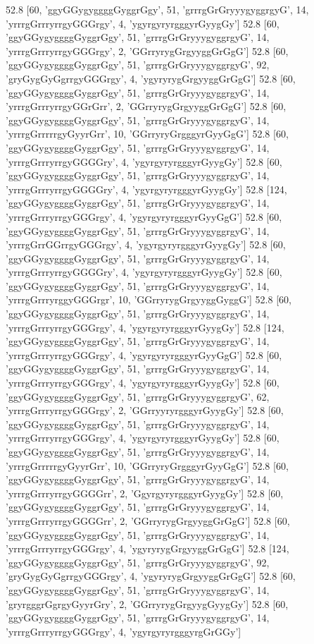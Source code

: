 52.8 [60, 'ggyGGygyggggGyggrGgy', 51, 'grrrgGrGryyygyggrgyG', 14, 'yrrrgGrrryrrgyGGGrgy', 4, 'ygyrgyryrgggyrGyygGy']
52.8 [60, 'ggyGGygyggggGyggrGgy', 51, 'grrrgGrGryyygyggrgyG', 14, 'yrrrgGrrryrrgyGGGrgy', 2, 'GGrryrygGrgyyggGrGgG']
52.8 [60, 'ggyGGygyggggGyggrGgy', 51, 'grrrgGrGryyygyggrgyG', 92, 'gryGygGyGgrrgyGGGrgy', 4, 'ygyryrygGrgyyggGrGgG']
52.8 [60, 'ggyGGygyggggGyggrGgy', 51, 'grrrgGrGryyygyggrgyG', 14, 'yrrrgGrrryrrgyGGrGrr', 2, 'GGrryrygGrgyyggGrGgG']
52.8 [60, 'ggyGGygyggggGyggrGgy', 51, 'grrrgGrGryyygyggrgyG', 14, 'yrrrgGrrrrrgyGyyrGrr', 10, 'GGrryryGrgggyrGyyGgG']
52.8 [60, 'ggyGGygyggggGyggrGgy', 51, 'grrrgGrGryyygyggrgyG', 14, 'yrrrgGrrryrrgyGGGGry', 4, 'ygyrgyryrgggyrGyygGy']
52.8 [60, 'ggyGGygyggggGyggrGgy', 51, 'grrrgGrGryyygyggrgyG', 14, 'yrrrgGrrryrrgyGGGGry', 4, 'ygyrgyryrgggyrGyygGy']
52.8 [124, 'ggyGGygyggggGyggrGgy', 51, 'grrrgGrGryyygyggrgyG', 14, 'yrrrgGrrryrrgyGGGrgy', 4, 'ygyrgyryrgggyrGyyGgG']
52.8 [60, 'ggyGGygyggggGyggrGgy', 51, 'grrrgGrGryyygyggrgyG', 14, 'yrrrgGrrGGrrgyGGGrgy', 4, 'ygyrgyryrgggyrGyygGy']
52.8 [60, 'ggyGGygyggggGyggrGgy', 51, 'grrrgGrGryyygyggrgyG', 14, 'yrrrgGrrryrrgyGGGGry', 4, 'ygyrgyryrgggyrGyygGy']
52.8 [60, 'ggyGGygyggggGyggrGgy', 51, 'grrrgGrGryyygyggrgyG', 14, 'yrrrgGrrryrggyGGGrgr', 10, 'GGrryrygGrgyyggGyggG']
52.8 [60, 'ggyGGygyggggGyggrGgy', 51, 'grrrgGrGryyygyggrgyG', 14, 'yrrrgGrrryrrgyGGGrgy', 4, 'ygyrgyryrgggyrGyygGy']
52.8 [124, 'ggyGGygyggggGyggrGgy', 51, 'grrrgGrGryyygyggrgyG', 14, 'yrrrgGrrryrrgyGGGrgy', 4, 'ygyrgyryrgggyrGyyGgG']
52.8 [60, 'ggyGGygyggggGyggrGgy', 51, 'grrrgGrGryyygyggrgyG', 14, 'yrrrgGrrryrrgyGGGrgy', 4, 'ygyrgyryrgggyrGyygGy']
52.8 [60, 'ggyGGygyggggGyggrGgy', 51, 'grrrgGrGryyygyggrgyG', 62, 'yrrrgGrrryrrgyGGGrgy', 2, 'GGrryyryrgggyrGyygGy']
52.8 [60, 'ggyGGygyggggGyggrGgy', 51, 'grrrgGrGryyygyggrgyG', 14, 'yrrrgGrrryrrgyGGGrgy', 4, 'ygyrgyryrgggyrGyygGy']
52.8 [60, 'ggyGGygyggggGyggrGgy', 51, 'grrrgGrGryyygyggrgyG', 14, 'yrrrgGrrrrrgyGyyrGrr', 10, 'GGrryryGrgggyrGyyGgG']
52.8 [60, 'ggyGGygyggggGyggrGgy', 51, 'grrrgGrGryyygyggrgyG', 14, 'yrrrgGrrryrrgyGGGGrr', 2, 'GgyrgyryrgggyrGyygGy']
52.8 [60, 'ggyGGygyggggGyggrGgy', 51, 'grrrgGrGryyygyggrgyG', 14, 'yrrrgGrrryrrgyGGGGrr', 2, 'GGrryrygGrgyyggGrGgG']
52.8 [60, 'ggyGGygyggggGyggrGgy', 51, 'grrrgGrGryyygyggrgyG', 14, 'yrrrgGrrryrrgyGGGrgy', 4, 'ygyryrygGrgyyggGrGgG']
52.8 [124, 'ggyGGygyggggGyggrGgy', 51, 'grrrgGrGryyygyggrgyG', 92, 'gryGygGyGgrrgyGGGrgy', 4, 'ygyryrygGrgyyggGrGgG']
52.8 [60, 'ggyGGygyggggGyggrGgy', 51, 'grrrgGrGryyygyggrgyG', 14, 'gryrgggrGgrgyGyyrGry', 2, 'GGrryrygGrgyygGyygGy']
52.8 [60, 'ggyGGygyggggGyggrGgy', 51, 'grrrgGrGryyygyggrgyG', 14, 'yrrrgGrrryrrgyGGGrgy', 4, 'ygyrgyryrgggyrgGrGGy']
